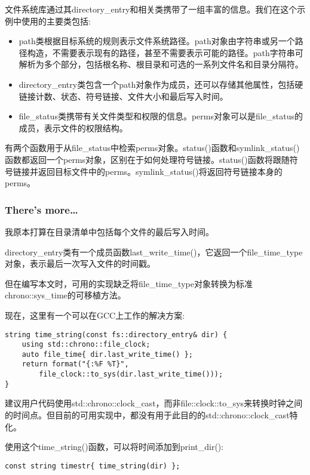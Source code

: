 文件系统库通过其directory\_entry和相关类携带了一组丰富的信息。我们在这个示例中使用的主要类包括:

\begin{itemize}
\item 
path类根据目标系统的规则表示文件系统路径。path对象由字符串或另一个路径构造，不需要表示现有的路径，甚至不需要表示可能的路径。path字符串可解析为多个部分，包括根名称、根目录和可选的一系列文件名和目录分隔符。

\item 
directory\_entry类包含一个path对象作为成员，还可以存储其他属性，包括硬链接计数、状态、符号链接、文件大小和最后写入时间。

\item 
file\_status类携带有关文件类型和权限的信息。perms对象可以是file\_status的成员，表示文件的权限结构。
\end{itemize}

有两个函数用于从file\_status中检索perms对象。status()函数和symlink\_status()函数都返回一个perms对象，区别在于如何处理符号链接。status()函数将跟随符号链接并返回目标文件中的perms。symlink\_status()将返回符号链接本身的perms。

\subsubsection{There's more…}

我原本打算在目录清单中包括每个文件的最后写入时间。

directory\_entry类有一个成员函数last\_write\_time()，它返回一个file\_time\_type对象，表示最后一次写入文件的时间戳。

但在编写本文时，可用的实现缺乏将file\_time\_type对象转换为标准chrono::sys\_time的可移植方法。

现在，这里有一个可以在GCC上工作的解决方案:

\begin{lstlisting}[style=styleCXX]
string time_string(const fs::directory_entry& dir) {
	using std::chrono::file_clock;
	auto file_time{ dir.last_write_time() };
	return format("{:%F %T}",
		file_clock::to_sys(dir.last_write_time()));
}
\end{lstlisting}

建议用户代码使用std::chrono::clock\_cast，而非file::clock::to\_sys来转换时钟之间的时间点。但目前的可用实现中，都没有用于此目的的std::chrono::clock\_cast特化。

使用这个time\_string()函数，可以将时间添加到print\_dir():

\begin{lstlisting}[style=styleCXX]
const string timestr{ time_string(dir) };
\end{lstlisting}

